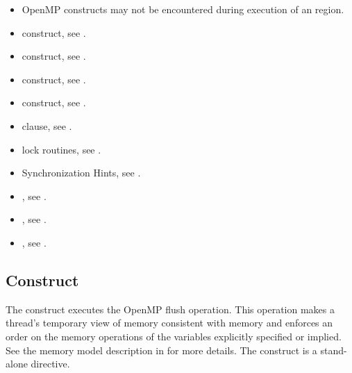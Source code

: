 \begin{itemize}
\item OpenMP constructs may not be encountered during execution of an
 region.
\end{itemize}


\crossreferences
\begin{itemize}
\item {} construct, see 
. 

\item {} construct, see 
.

\item {} construct, see 
.

\item {} construct, see 
.

\item {} clause, see 
.

\item lock routines, see 
.

\item Synchronization Hints, see
.

\item {}, see
.

\item {}, see
.

\item {}, see
.

\end{itemize}









\subsection{ Construct}
\label{subsec:flush Construct}
\summary
The  construct executes the OpenMP flush operation. This operation makes a 
thread’s temporary view of memory consistent with memory and enforces an order on 
the memory operations of the variables explicitly specified or implied. See the memory 
model description in  for more details. The  construct is a 
stand-alone directive.


